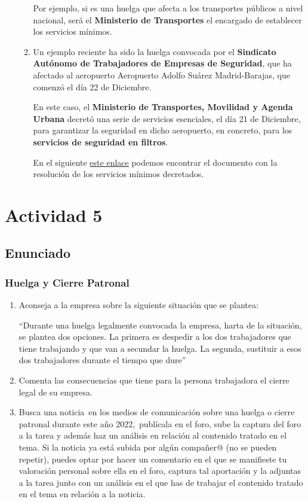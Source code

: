 \begin{enumerate}[label=(\alph*)]
\begin{enumerate}
        Por ejemplo, si es una huelga que afecta a los transportes públicos a nivel nacional, será el \textbf{Ministerio de Transportes} el encargado de establecer los servicios mínimos.

        \item Un ejemplo reciente ha sido la huelga convocada por el \textbf{Sindicato Autónomo de Trabajadores de Empresas de Seguridad}, que ha afectado al aeropuerto Aeropuerto Adolfo Suárez Madrid-Barajas, que comenzó el día 22 de Diciembre.

        En este caso, el \textbf{Ministerio de Transportes, Movilidad y Agenda Urbana} decretó una serie de servicios esenciales, el día 21 de Diciembre, para garantizar la seguridad en dicho aeropuerto, en concreto, para los \textbf{servicios de seguridad en filtros}.

        En el siguiente  \href{https://www.mitma.gob.es/recursos_mfom/paginabasica/recursos/resolucion_ssmm_huelga_servicios_auxiliares_de_seguridad_sagital.pdf}{este enlace} podemos encontrar el documento con la resolución de los servicios mínimos decretados.
    \end{enumerate}
\end{enumerate}

\section{Actividad 5}
\subsection{Enunciado}

\subsubsection*{Huelga y Cierre Patronal}
\begin{enumerate}
    \item Aconseja a la empresa sobre la siguiente situación que se plantea:

    ``Durante una huelga legalmente convocada la empresa, harta de la situación, se plantea dos opciones. La primera es despedir a los dos trabajadores que tiene trabajando y  que van a secundar la huelga. La segunda, sustituir a esos dos trabajadores durante el tiempo que dure''

    \item Comenta las consecuencias que tiene para la persona trabajadora el cierre legal de su empresa.

    \item Busca una noticia en los medios de comunicación sobre una huelga o cierre patronal durante este año 2022, publícala en el foro, sube la captura del foro a la tarea y además haz un análisis en relación al contenido tratado en el tema. Si la noticia ya está subida por algún compañer@ (no se pueden repetir), puedes optar por hacer un comentario en el que se manifieste tu valoración personal sobre ella en el foro, captura tal aportación y la adjuntas a la tarea junto con un análisis en el que has de trabajar el contenido tratado en el tema en relación a la noticia.
\end{enumerate}

